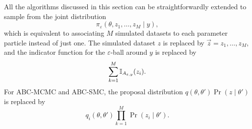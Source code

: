 All the algorithms discussed in this section can be straightforwardly extended
to sample from the joint distribution
\[
  \pi_\varepsilon(\theta, z_1, \ldots, z_M \mid y),
\]
which is equivalent to associating $M$ simulated datasets to each parameter
particle instead of just one. The simulated dataset $z$ is replaced by
$\vec{z} = z_1, \ldots, z_M$, and the indicator function for the
$\varepsilon$-ball around $y$ is replaced by
\[
  \sum_{k=1}^M \mathbb{I}_{A_{\varepsilon, y}} (z_i).
\]
For \gls{ABC}-\gls{MCMC} and \gls{ABC}-\gls{SMC}, the proposal distribution
$q(\theta, \theta') \Pr(z \mid \theta')$ is replaced by
\[
  q_i(\theta, \theta') \prod_{k=1}^M \Pr(z_i \mid \theta').
\]
